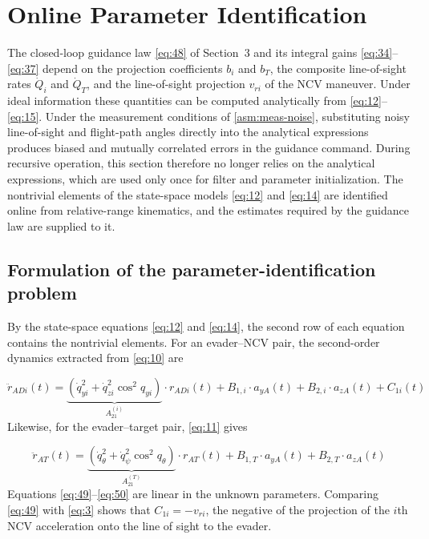 \section{Online Parameter Identification}
The closed-loop guidance law \eqref{eq:48} of Section~3 and its integral gains \eqref{eq:34}--\eqref{eq:37} depend on the projection coefficients ${b_i}$ and ${b_T}$, the composite line-of-sight rates ${\dot Q_i}$ and ${\dot Q_T}$, and the line-of-sight projection ${v_{ri}}$ of the NCV maneuver. Under ideal information these quantities can be computed analytically from \eqref{eq:12}--\eqref{eq:15}. Under the measurement conditions of \cref{asm:meas-noise}, substituting noisy line-of-sight and flight-path angles directly into the analytical expressions produces biased and mutually correlated errors in the guidance command. During recursive operation, this section therefore no longer relies on the analytical expressions, which are used only once for filter and parameter initialization. The nontrivial elements of the state-space models \eqref{eq:12} and \eqref{eq:14} are identified online from relative-range kinematics, and the estimates required by the guidance law are supplied to it.

\subsection{Formulation of the parameter-identification problem}
By the state-space equations \eqref{eq:12} and \eqref{eq:14}, the second row of each equation contains the nontrivial elements. For an evader--NCV pair, the second-order dynamics extracted from \eqref{eq:10} are

\begin{equation}
\label{eq:49}
{\ddot r_{ADi}}(t) = \underbrace {(\dot q_{yi}^2 + \dot q_{zi}^2{{\cos }^2}{q_{yi}})}_{A_{21}^{(i)}} \cdot {r_{ADi}}(t) + {B_{1,i}} \cdot {a_{yA}}(t) + {B_{2,i}} \cdot {a_{zA}}(t) + {C_{1i}}(t)
\end{equation}
Likewise, for the evader--target pair, \eqref{eq:11} gives

\begin{equation}
\label{eq:50}
{\ddot r_{AT}}(t) = \underbrace {(\dot q_\theta ^2 + \dot q_\psi ^2{{\cos }^2}{q_\theta })}_{A_{21}^{(T)}} \cdot {r_{AT}}(t) + {B_{1,T}} \cdot {a_{yA}}(t) + {B_{2,T}} \cdot {a_{zA}}(t)
\end{equation}
Equations \eqref{eq:49}--\eqref{eq:50} are linear in the unknown parameters. Comparing \eqref{eq:49} with \eqref{eq:3} shows that ${C_{1i}} =  - {v_{ri}}$, the negative of the projection of the $i$th NCV acceleration onto the line of sight to the evader.

